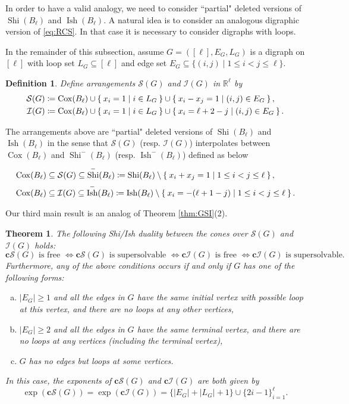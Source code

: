 \documentclass[11pt]{article}
\newtheorem{definition}[theo]{Definition}
\newtheorem{theorem}[theo]{Theorem}
\theoremstyle{definition}
\numberwithin{equation}{section}
\DeclareMathOperator{\Cox}{Cox}
\DeclareMathOperator{\Shi}{Shi}
\DeclareMathOperator{\Ish}{Ish}
\newcommand{\mcS}{\mathcal{S}}
\newcommand{\I}{\mathcal{I}}
\newcommand{\R}{\mathbb{R}}
\newcommand{\tbf}{\textbf}
\begin{document}
In order to have a valid analogy, we need to consider ``partial" deleted versions of $ \Shi(B_\ell)$ and $ \Ish(B_\ell)$. 
A natural idea is to consider an analogous digraphic version of \eqref{eq:RCS}.
In that case it is necessary to consider digraphs with loops.

In the remainder of this subsection, assume $G=([\ell],E_G,L_G)$ is a digraph on $[\ell]$ with loop set $L_G\subseteq[\ell]$ and edge set $E_G \subseteq \{(i,j) \mid 1 \leq i < j \leq \ell\}$. 
\begin{definition}
\label{def:Del-SI}
Define arrangements $\mcS(G)$
 and $\I(G)$ in $\R^\ell$ by
\begin{align*}
\mcS(G) & \coloneqq \Cox(B_\ell)  \cup  \Set{ x_{i} = 1 | i \in L_G} \cup  \Set{ x_{i}-x_{j}= 1 | (i,j) \in E_G}, \\
\I(G) & \coloneqq \Cox(B_\ell)  \cup  \Set{ x_{i} = 1 | i \in L_G} \cup  \Set{ x_{i} = \ell+2-j | (i,j) \in E_G}.
\end{align*}
\end{definition}

The arrangements above are ``partial" deleted versions of $ \Shi(B_\ell)$ and $ \Ish(B_\ell)$ in the sense that 
$\mcS(G)$ (resp. $ \I(G) $) interpolates between $\Cox(B_\ell)$ and  $\Shi^-(B_\ell)$ (resp. $\Ish^-(B_\ell)$) defined as below
\begin{align*}
 & \Cox(B_\ell) \subseteq  \mcS(G)   \subseteq \Shi^-(B_\ell) \coloneqq \Shi(B_\ell) \setminus \Set{ x_{i}+ x_{j}= 1 | 1 \leq i < j \leq \ell}, \\
 & \Cox(B_\ell) \subseteq \I(G)   \subseteq \Ish^-(B_\ell) \coloneqq \Ish(B_\ell)  \setminus \Set{ x_{i} =  -(\ell+1-j )| 1 \leq i < j \leq \ell}.
\end{align*}

Our third main result is an analog of Theorem \ref{thm:GSI}(2). 
\begin{theorem}
 \label{thm:SI-sym-G}
The following Shi/Ish duality between the cones over $\mcS(G)$ and $\I(G)$ holds:
$$\tbf{c} \mcS(G) \text{ is free } \Leftrightarrow \tbf{c}\mcS(G) \text{ is supersolvable } \Leftrightarrow \tbf{c} \I(G) \text{ is free } \Leftrightarrow \tbf{c}\I(G) \text{ is supersolvable}.$$
Furthermore, any of the above conditions occurs if and only if $G$ has one of the following forms: 
 \begin{enumerate}[(a)]
\item $|E_G|\ge1$ and  all the edges in $G$ have the same initial vertex with possible loop at this vertex, and there are no loops at any other vertices, 
\item $|E_G|\ge2$ and all the edges in $G$ have the same terminal vertex, and there are no loops at any vertices (including  the terminal vertex),
\item $G$ has no edges but loops at some vertices. 
\end{enumerate}
In this case, the exponents of  $\tbf{c} \mcS(G)$ and $\tbf{c}\I(G)$ are both given by 
$$\exp(\tbf{c} \mcS(G)) = \exp(\tbf{c}\I(G)) = \{|E_G|+|L_G|+1\} \cup \{2i-1\}_{i=1}^\ell.$$
 \end{theorem} 
 
\end{document}
